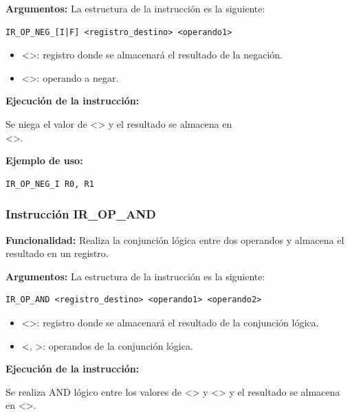 \noindent
\textbf{Argumentos:} La estructura de la instrucción es la siguiente:
\begin{verbatim}
IR_OP_NEG_[I|F] <registro_destino> <operando1>
\end{verbatim}
\begin{itemize}
    \item <>: registro donde se almacenará el resultado de la negación.
    \item <>: operando a negar.
\end{itemize}

\noindent
\textbf{Ejecución de la instrucción:}
\vspace{0.3cm}

\noindent
Se niega el valor de <> y el resultado se almacena en \\
<>.
\vspace{0.3cm}

\noindent
\textbf{Ejemplo de uso:}
\begin{verbatim}
IR_OP_NEG_I R0, R1
\end{verbatim}

\subsubsection{Instrucción IR\_OP\_AND}\label{subsubsec:IR_OP_AND}
\noindent
\textbf{Funcionalidad:} Realiza la conjunción lógica entre dos operandos y almacena el resultado en un registro.

\noindent
\textbf{Argumentos:} La estructura de la instrucción es la siguiente:
\begin{verbatim}
IR_OP_AND <registro_destino> <operando1> <operando2>
\end{verbatim}
\begin{itemize}
    \item <>: registro donde se almacenará el resultado de la conjunción lógica.
    \item <, >: operandos de la conjunción lógica.
\end{itemize}

\noindent
\textbf{Ejecución de la instrucción:}
\vspace{0.3cm}

\noindent
Se realiza AND lógico entre los valores de <> y <> y el resultado se almacena en <>.
\vspace{0.3cm}

